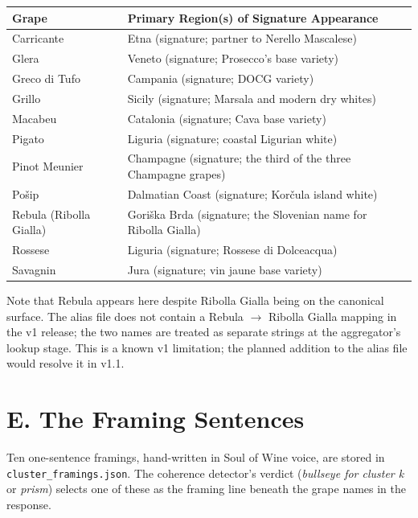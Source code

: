 \documentclass[11pt]{article}
\begin{document}
\begin{small}
\begin{longtable}{p{4cm} p{8cm}}
\toprule
\textbf{Grape} & \textbf{Primary Region(s) of Signature Appearance} \\
\midrule
\endhead
Carricante           & Etna (signature; partner to Nerello Mascalese) \\
Glera                & Veneto (signature; Prosecco's base variety) \\
Greco di Tufo        & Campania (signature; DOCG variety) \\
Grillo               & Sicily (signature; Marsala and modern dry whites) \\
Macabeu              & Catalonia (signature; Cava base variety) \\
Pigato               & Liguria (signature; coastal Ligurian white) \\
Pinot Meunier        & Champagne (signature; the third of the three Champagne grapes) \\
Po\v{s}ip            & Dalmatian Coast (signature; Korčula island white) \\
Rebula (Ribolla Gialla)  & Gori\v{s}ka Brda (signature; the Slovenian name for Ribolla Gialla) \\
Rossese              & Liguria (signature; Rossese di Dolceacqua) \\
Savagnin             & Jura (signature; vin jaune base variety) \\
\bottomrule
\end{longtable}
\end{small}

Note that Rebula appears here despite Ribolla Gialla being on the canonical surface. The alias file does not contain a Rebula $\rightarrow$ Ribolla Gialla mapping in the v1 release; the two names are treated as separate strings at the aggregator's lookup stage. This is a known v1 limitation; the planned addition to the alias file would resolve it in v1.1.

\section*{E. The Framing Sentences}

Ten one-sentence framings, hand-written in Soul of Wine voice, are stored in \texttt{cluster\_framings.json}. The coherence detector's verdict (\emph{bullseye for cluster k} or \emph{prism}) selects one of these as the framing line beneath the grape names in the response.
\end{document}
